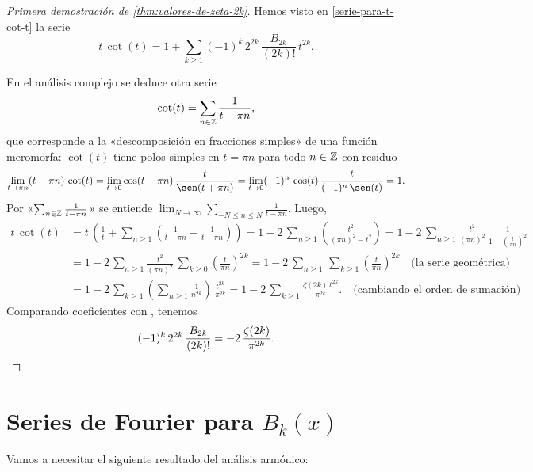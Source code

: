 \documentclass{article}
\numberwithin{equation}{section}
\theoremstyle{definition}
\begin{document}
\begin{proof}[Primera demostración de \ref{thm:valores-de-zeta-2k}]
  Hemos visto en \ref{serie-para-t-cot-t} la serie
  \begin{equation}
    \label{eqn:serie-para-t-cot-t}
    t\,\cot (t) = 1 + \sum_{k \ge 1} (-1)^k \, 2^{2k}\,\frac{B_{2k}}{(2k)!}\,t^{2k}.
  \end{equation}

  En el análisis complejo se deduce otra serie
  \cite[Chapter 5, \S 2]{Ahlfors-1978}
  $$\cot (t) = \sum_{n\in \mathbb{Z}} \frac{1}{t - \pi n},$$
  que corresponde a la «descomposición en fracciones simples» de una función
  meromorfa: $\cot (t)$ tiene polos simples en $t = \pi n$ para todo $n \in \mathbb{Z}$
  con residuo
  $$\lim_{t \to \pi n} (t - \pi n)\,\cot (t) =
  \lim_{t \to 0} \cos (t+\pi n) \, \frac{t}{\sen (t + \pi n)} =
  \lim_{t \to 0} (-1)^n\,\cos (t) \, \frac{t}{(-1)^n\,\sen (t)} = 1.$$
  Por «$\sum_{n\in \mathbb{Z}} \frac{1}{t - \pi n}$» se entiende
  $\lim_{N\to \infty} \sum_{-N \le n \le N} \frac{1}{t - \pi n}$.
  Luego,
  \begin{align*}
    t\,\cot (t) & = t\,\left(\frac{1}{t} + \sum_{n \ge 1} \left(\frac{1}{t - \pi n} + \frac{1}{t + \pi n}\right)\right) = 1 - 2\,\sum_{n \ge 1} \left(\frac{t^2}{(\pi n)^2 - t^2}\right) = 1 - 2\,\sum_{n \ge 1} \frac{t^2}{(\pi n)^2} \, \frac{1}{1-\left(\frac{t}{\pi n}\right)^2} \\
                & = 1 - 2\,\sum_{n \ge 1} \frac{t^2}{(\pi n)^2} \, \sum_{k \ge 0} \left(\frac{t}{\pi n}\right)^{2k} = 1 - 2\,\sum_{n \ge 1} \, \sum_{k \ge 1} \left(\frac{t}{\pi n}\right)^{2k} \quad \text{(la serie geométrica)}\\
                & = 1 - 2\,\sum_{k \ge 1} \left(\sum_{n\ge 1} \frac{1}{n^{2k}}\right)\,\frac{t^{2k}}{\pi^{2k}} = 1 - 2\,\sum_{k\ge 1} \frac{\zeta (2k)\,t^{2k}}{\pi^{2k}}. \quad \text{(cambiando el orden de sumación)}
  \end{align*}
  Comparando coeficientes con , tenemos
  \[ (-1)^k \, 2^{2k}\,\frac{B_{2k}}{(2k)!} = -2\,\frac{\zeta (2k)}{\pi^{2k}}. \qedhere \]
\end{proof}


\section{Series de Fourier para $B_k (x)$}

Vamos a necesitar el siguiente resultado del análisis armónico:
\end{document}

